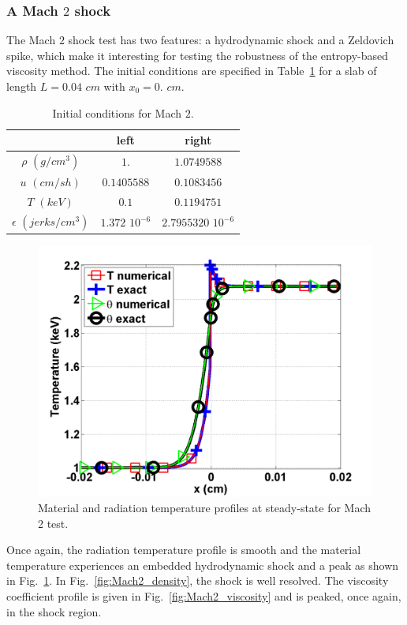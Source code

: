 \documentclass[review]{elsarticle}
\newcommand{\fig}[1]{Fig.~\ref{#1}}                      %
\newcommand{\tbl}[1]{Table~\ref{#1}}                     %
\begin{document}
\subsubsection{A Mach $2$ shock}

The Mach $2$ shock test has two features: a hydrodynamic shock and a Zeldovich spike, which make it interesting for testing the robustness of the entropy-based viscosity method. The initial conditions are specified in \tbl{tbl:table5} for a slab of length $L=0.04$ $cm$ with $x_0 = 0.$ $cm$.
\begin{table}[H]
\caption{\label{tbl:table5} Initial conditions for Mach $2$.}
\begin{center}
\begin{tabular}{|c|c|c|}
\hline 
 & left  & right \\ \hline
$\rho$ $(g/cm^3)$ &$1.$ & $1.0749588$ \\ \hline
$u$ $(cm/sh)$& $0.1405588$ & $0.1083456$ \\ \hline
$T$ $(keV)$& $0.1$ & $0.1194751$\\ \hline
$\epsilon$ $(jerks/cm^3)$ & $1.372$ $10^{-6}$ & $2.7955320$ $10^{-6}$\\
\hline
\end{tabular}  
\end{center}  
\end{table}
\begin{figure}[H]
                \centering
                \includegraphics[width=\textwidth]{Mach_2_nel_2000_temperature.png}
        \caption{Material and radiation temperature profiles at steady-state for Mach 2 test.}\label{fig:Mach2_temp}
\end{figure}
Once again, the radiation temperature profile is smooth and the material temperature experiences an embedded hydrodynamic shock and a peak as shown in \fig{fig:Mach2_temp}. In \fig{fig:Mach2_density}, the shock is well resolved. The viscosity coefficient profile is given in \fig{fig:Mach2_viscosity} and is peaked, once again, in the shock region. 
\end{document}
